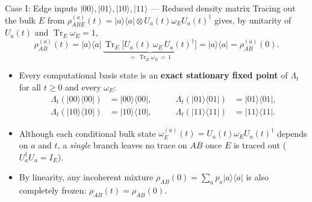 \documentclass[aspectratio=169,11pt]{beamer}
\newcommand{\ket}[1]{\lvert #1\rangle}
\newcommand{\bra}[1]{\langle #1\rvert}
\newcommand{\Tr}{\operatorname{Tr}}
\begin{document}
\begin{frame}{Case I: Edge inputs $\ket{00},\ket{01},\ket{10},\ket{11}$ --- Reduced density matrix}
\small
Tracing out the bulk $E$ from $\rho_{ABE}^{(a)}(t)=\ket a\bra a\otimes U_a(t)\omega_EU_a(t)^\dagger$ gives, by unitarity of $U_a(t)$ and $\Tr_E\omega_E=1$,
\[
\rho_{AB}^{(a)}(t)
=\ket a\bra a\,\underbrace{\Tr_E\bigl[U_a(t)\,\omega_E\,U_a(t)^\dagger\bigr]}_{=\,\Tr_E\omega_E\,=\,1}
=\ket a\bra a=\rho_{AB}^{(a)}(0).
\]
\begin{itemize}\setlength\itemsep{6pt}
\item Every computational basis state is an \textbf{exact stationary fixed point} of $\Lambda_t$ for all $t\ge0$ and every $\omega_E$:
\[
\boxed{\begin{aligned}
\Lambda_t(\ket{00}\bra{00})&=\ket{00}\bra{00}, &\qquad \Lambda_t(\ket{01}\bra{01})&=\ket{01}\bra{01},\\
\Lambda_t(\ket{10}\bra{10})&=\ket{10}\bra{10}, &\qquad \Lambda_t(\ket{11}\bra{11})&=\ket{11}\bra{11}.
\end{aligned}}
\]
\item Although each conditional bulk state $\omega_E^{(a)}(t)=U_a(t)\omega_EU_a(t)^\dagger$ depends on $a$ and $t$, a \emph{single} branch leaves no trace on $AB$ once $E$ is traced out ($U_a^\dagger U_a=I_E$).
\item By linearity, any incoherent mixture $\rho_{AB}(0)=\sum_a p_a\ket a\bra a$ is also completely frozen: $\rho_{AB}(t)=\rho_{AB}(0)$.
\end{itemize}
\end{frame}
\end{document}
